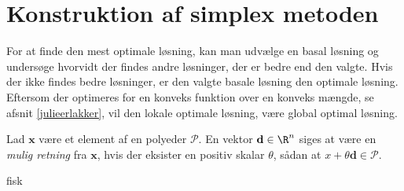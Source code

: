 %
\section{Konstruktion af simplex metoden}
%
For at finde den mest optimale løsning, kan man udvælge en basal løsning og undersøge hvorvidt der findes andre løsninger, der er bedre end den valgte. 
Hvis der ikke findes bedre løsninger, er den valgte basale løsning den optimale løsning. 
Eftersom der optimeres for en konveks funktion over en konveks mængde, se afsnit \ref{julieerlakker},  %
vil den lokale optimale løsning, være global optimal løsning. 
%
%
\begin{defn}{}{}
Lad $\textbf{x}$ være et element af en polyeder $\mathcal{P}$.
En vektor $\textbf{d}\in \R^n$ siges at være en  \textit{mulig retning} fra $\textbf{x}$, hvis der eksister en positiv skalar $\theta$, sådan at $x+\theta \textbf{d}\in \mathcal{P}$.
\end{defn}
%
fisk 

%